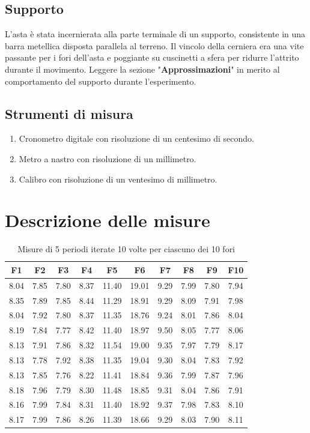 \documentclass[11pt]{article}
\begin{document}
\subsection{Supporto}
L'asta è stata incernierata alla parte terminale di un supporto, consistente in una barra metellica disposta parallela al terreno. 
Il vincolo della cerniera era una vite passante per i fori dell'asta e poggiante su cuscinetti a sfera per ridurre l'attrito durante il movimento.
Leggere la sezione "\textbf{Approssimazioni}" in merito al comportamento del supporto durante l'esperimento.


\subsection{Strumenti di misura}
\begin{enumerate}
\item Cronometro digitale con risoluzione di un centesimo di secondo.
\item Metro a nastro con risoluzione di un millimetro.
\item Calibro con risoluzione di un ventesimo di millimetro.

\end{enumerate}
\section{Descrizione delle misure}

\begin{table}
    \centering
    \caption{Misure di 5 periodi iterate 10 volte per ciascuno dei 10 fori }
 
    \begin{tabular}{|c|c|c|c|c|c|c|c|c|c|}
        \hline
        \textbf{F1} & \textbf{F2} & \textbf{F3} & \textbf{F4} & \textbf{F5} & \textbf{F6} & \textbf{F7} & \textbf{F8} & \textbf{F9} & \textbf{F10} \\
        \hline
 
  8.04 & 7.85 & 7.80 & 8.37 & 11.40 & 19.01 & 9.29 & 7.99 & 7.80 & 7.94 \\
  8.35 & 7.89 & 7.85 & 8.44 & 11.29 & 18.91 & 9.29 & 8.09 & 7.91 & 7.98 \\
  8.04 & 7.92 & 7.80 & 8.37 & 11.35 & 18.76 & 9.24 & 8.01 & 7.86 & 8.04 \\
  8.19 & 7.84 & 7.77 & 8.42 & 11.40 & 18.97 & 9.50 & 8.05 & 7.77 & 8.06 \\
  8.13 & 7.91 & 7.86 & 8.32 & 11.54 & 19.00 & 9.35 & 7.97 & 7.79 & 8.17 \\
  8.13 & 7.78 & 7.92 & 8.38 & 11.35 & 19.04 & 9.30 & 8.04 & 7.83 & 7.92 \\
  8.13 & 7.85 & 7.76 & 8.22 & 11.41 & 18.84 & 9.36 & 7.99 & 7.87 & 7.96 \\
  8.18 & 7.96 & 7.79 & 8.30 & 11.48 & 18.85 & 9.31 & 8.04 & 7.86 & 7.91 \\
  8.16 & 7.99 & 7.84 & 8.31 & 11.40 & 18.92 & 9.37 & 7.98 & 7.83 & 8.10 \\
  8.17 & 7.99 & 7.86 & 8.26 & 11.39 & 18.66 & 9.29 & 8.03 & 7.90 & 8.11 \\
 \hline
    \end{tabular}
\end{table}
\end{document}
